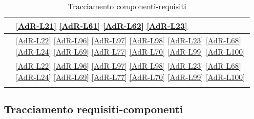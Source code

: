 \begin{longtable}{|>{\centering}P{7cm}|>{\centering}P{5cm}|}
	\hline {} & \ref{AdR-L21} \linebreak \ref{AdR-L61} \linebreak \ref{AdR-L62} \linebreak \ref{AdR-L23} \tabularnewline
	\hline {} & \ref{AdR-L22} \linebreak \ref{AdR-L96} \linebreak \ref{AdR-L97} \linebreak \ref{AdR-L98} \linebreak \ref{AdR-L23} \linebreak \ref{AdR-L68} \linebreak \ref{AdR-L24} \linebreak \ref{AdR-L69} \linebreak \ref{AdR-L77} \linebreak \ref{AdR-L70} \linebreak \ref{AdR-L99} \linebreak \ref{AdR-L100} \tabularnewline
	\hline {} & \ref{AdR-L22} \linebreak \ref{AdR-L96} \linebreak \ref{AdR-L97} \linebreak \ref{AdR-L98} \linebreak \ref{AdR-L23} \linebreak \ref{AdR-L68} \linebreak \ref{AdR-L24} \linebreak \ref{AdR-L69} \linebreak \ref{AdR-L77} \linebreak \ref{AdR-L70} \linebreak \ref{AdR-L99} \linebreak \ref{AdR-L100} \tabularnewline
	
	\hline
	\caption{Tracciamento componenti-requisiti}
\end{longtable}

\subsection{Tracciamento requisiti-componenti}


